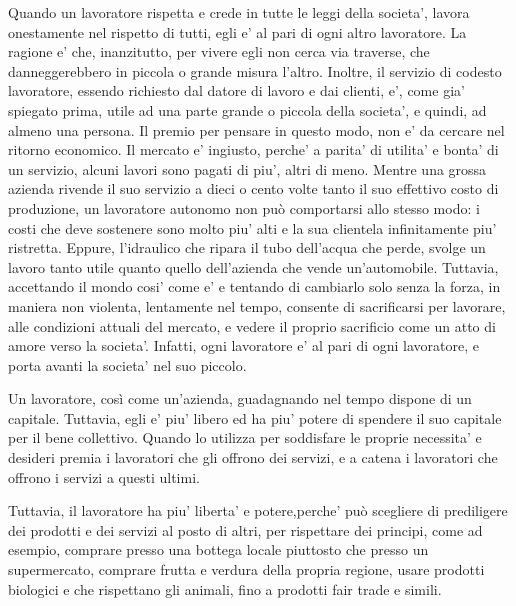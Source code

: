 Quando un lavoratore rispetta e crede in tutte le leggi della societa', lavora onestamente nel rispetto di tutti, egli e' al pari di ogni altro lavoratore. La ragione e' che, inanzitutto, per vivere egli non cerca via traverse, che danneggerebbero in piccola o grande misura l'altro. Inoltre, il servizio di codesto lavoratore, essendo richiesto dal datore di lavoro e dai clienti, e', come gia' spiegato prima, utile ad una parte grande o piccola della societa', e quindi, ad almeno una persona.
  Il premio per pensare in questo modo, non e’ da cercare nel ritorno economico. Il mercato e' ingiusto, perche' a parita' di utilita' e bonta' di un servizio, alcuni lavori sono pagati di piu', altri di meno. Mentre una grossa azienda rivende il suo servizio a dieci o cento volte tanto il suo effettivo costo di produzione, un lavoratore autonomo non può comportarsi allo stesso modo: i costi che deve sostenere sono molto piu' alti e la sua clientela infinitamente piu' ristretta. Eppure, l'idraulico che ripara il tubo dell'acqua che perde, svolge un lavoro tanto utile quanto quello dell'azienda che vende un’automobile.
Tuttavia, accettando il mondo cosi’ come e’ e tentando di cambiarlo solo senza la forza, in maniera non violenta, lentamente nel tempo, consente di sacrificarsi per lavorare, alle condizioni attuali del mercato, e vedere il proprio sacrificio come un atto di amore verso la societa’. Infatti, ogni lavoratore e' al pari di ogni lavoratore, e porta avanti la societa' nel suo piccolo.

Un lavoratore, così come un'azienda, guadagnando nel tempo dispone di un capitale. Tuttavia, egli e' piu' libero ed ha piu' potere di spendere il suo capitale per il bene collettivo. Quando lo utilizza per soddisfare le proprie necessita' e desideri premia i lavoratori che gli offrono dei servizi, e a catena i lavoratori che offrono i servizi a questi ultimi.

Tuttavia, il lavoratore ha piu' liberta' e potere,perche' può scegliere di prediligere dei prodotti e dei servizi al posto di altri, per rispettare dei principi, come ad esempio, comprare presso una bottega locale piuttosto che presso un supermercato, comprare frutta e verdura della propria regione, usare prodotti biologici e che rispettano gli animali, fino a prodotti fair trade e simili.
